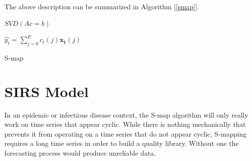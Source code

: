     The above description can be summarized in Algorithm [\ref{smap}].

    \begin{algorithm}

        \BlankLine

        \DontPrintSemicolon


        \BlankLine


        \BlankLine


        \BlankLine

        $SVD(Ac = b)$

        \BlankLine

        $\hat{y_t} = \sum_{j = 0}^{E} c_t (j) \mathbf{x_t} (j)$

        \BlankLine


        \BlankLine

        \caption{S-map \label{smap}}

    \end{algorithm}


\section{SIRS Model}

	In an epidemic or infectious disease context, the S-map algorithm will only really work on time series that appear cyclic. While there is nothing mechanically that prevents it from operating on a time series that do not appear cyclic, S-mapping requires a long time series in order to build a quality library. Without one the forecasting process would produce unreliable data.

